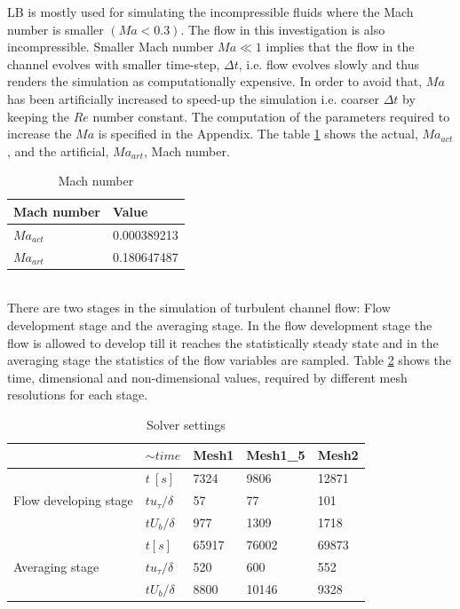 LB is mostly used for simulating the incompressible fluids where the Mach number is smaller $\left(Ma<0.3\right)$. The flow in this investigation is also incompressible. Smaller Mach number $Ma\ll 1$ implies that the flow in the channel evolves with smaller time-step, $\Delta t$, i.e. flow evolves slowly and thus renders the simulation as computationally expensive. In order to avoid that, $Ma$ has been artificially increased to speed-up the simulation i.e. coarser $\Delta t$ by keeping the $Re$ number constant. The computation of the parameters required to increase the $Ma$ is specified in the Appendix.  The table  \ref{Mach settings} shows the actual, $Ma_{act}$, and the artificial, $Ma_{art}$, Mach number.\\
%
\begin{table}[h!]
\begin{center}
\begin{tabular}{ p{2.2cm}|p{2cm} } 
\hline
Mach number & Value \\
  \hline
  \multirow{1}{5em}{$Ma_{act}$} & 0.000389213 \\
  \hline
  \multirow{1}{5em}{$Ma_{art}$} & 0.180647487 \\
  \hline
\end{tabular}
\end{center}
\caption{Mach number}
\label{Mach settings}
\end{table}
%
\\
There are two stages in the simulation of turbulent channel flow: Flow development stage and the averaging stage. In the flow development stage the flow is allowed to develop till it reaches the statistically steady state and in the averaging stage the statistics of the flow variables are sampled. Table \ref{Solver settings} shows the time, dimensional and non-dimensional values, required by different mesh resolutions for each stage.
%
\begin{table}[h!]
\begin{center}
\begin{tabular}{ |p{2cm}|p{1.5cm}|p{2cm}|p{2cm}|p{2cm}|  } 
\hline
 &$\sim time$ & Mesh1 & Mesh1\_5 & Mesh2 \\
  \hline
  \multirow{3}{6em}{Flow developing stage} & $t\ [s]$ & 7324 & 9806 & 12871\\
  & $tu_\tau/\delta$ & 57 & 77 & 101\\ 
  & $tU_b/\delta$ & 977 & 1309 & 1718\\ 
  \hline
  \multirow{3}{6em}{Averaging stage} & $t [s]$ & 65917 & 76002 & 69873\\
  & $tu_\tau/\delta$ & 520  & 600 & 552\\ 
  & $tU_b/\delta$ & 8800 & 10146 & 9328\\ 
  \hline
\end{tabular}
\end{center}
\caption{Solver settings}
\label{Solver settings}
\end{table}
